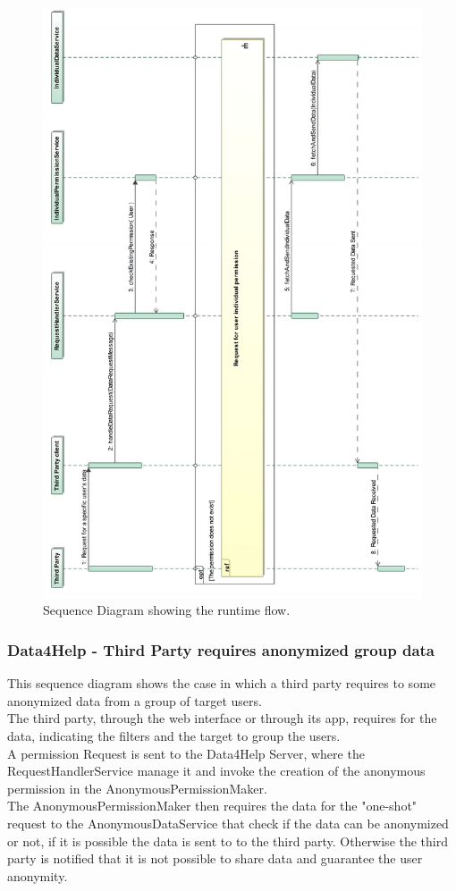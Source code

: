 \documentclass[a4paper]{article}
\begin{document}
\begin{figure}[H]
    \centering
    \includegraphics[width=\linewidth]{SequenceDiagram-RequestForSpecificUserData}
    \caption{Sequence Diagram showing the runtime flow.}
    \label{fig:my_label}
\end{figure}
\clearpage

\subsubsection{Data4Help - Third Party requires anonymized group data}
This sequence diagram shows the case in which a third party requires to some anonymized data from a group of target users. \\
The third party, through the web interface or through its app, requires for the data, indicating the filters and the target to group the users. \\
A permission Request is sent to the Data4Help Server, where the RequestHandlerService manage it and invoke the creation of the anonymous permission in the AnonymousPermissionMaker. \\
The AnonymousPermissionMaker then requires the data for the "one-shot" request to the AnonymousDataService that check if the data can be anonymized or not, if it is possible the data is sent to to the third party. Otherwise the third party is notified that it is not possible to share data and guarantee the user anonymity.
\end{document}
